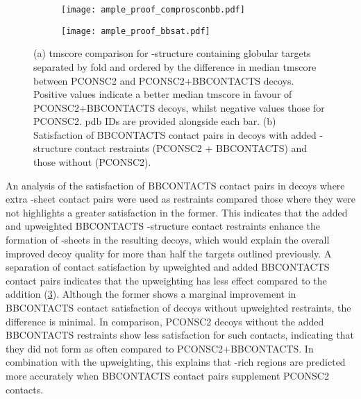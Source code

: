 \begin{figure}[H]
    \centering
    \begin{subfigure}[b]{\textwidth}
        \centering
        \texttt{[image: ample\_proof\_comprosconbb.pdf]}
        \caption{}
        \label{fig:ample_proof_comprosconbb}
    \end{subfigure}
    
    \begin{subfigure}[b]{\textwidth}
        \centering
        \texttt{[image: ample\_proof\_bbsat.pdf]}
        \caption{}
        \label{fig:ample_proof_bbsat}
    \end{subfigure}
    
    \caption[Decoy analysis of effects of BBCONTACTS contact addition]{(a) \Gls{tmscore} comparison for \textbeta-structure containing globular targets separated by fold and ordered by the difference in median \gls{tmscore} between PCONSC2 and PCONSC2+BBCONTACTS decoys. Positive values indicate a better median \gls{tmscore} in favour of PCONSC2+BBCONTACTS decoys, whilst negative values those for PCONSC2. \Gls{pdb} IDs are provided alongside each bar. (b) Satisfaction of BBCONTACTS contact pairs in decoys with added \textbeta-structure contact restraints (PCONSC2 + BBCONTACTS) and those without (PCONSC2).}
\end{figure}

An analysis of the satisfaction of BBCONTACTS contact pairs in decoys where extra \textbeta-sheet contact pairs were used as restraints compared those where they were not highlights a greater satisfaction in the former. This indicates that the added and upweighted BBCONTACTS \textbeta-structure contact restraints enhance the formation of \textbeta-sheets in the resulting decoys, which would explain the overall improved decoy quality for more than half the targets outlined previously. A separation of contact satisfaction by upweighted and added BBCONTACTS contact pairs indicates that the upweighting has less effect compared to the addition (\cref{fig:ample_proof_bbsat}). Although the former shows a marginal improvement in BBCONTACTS contact satisfaction of decoys without upweighted restraints, the difference is minimal. In comparison, PCONSC2 decoys without the added BBCONTACTS restraints show less satisfaction for such contacts, indicating that they did not form as often compared to PCONSC2+BBCONTACTS. In combination with the upweighting, this explains that \textbeta-rich regions are predicted more accurately when BBCONTACTS contact pairs supplement PCONSC2 contacts.

